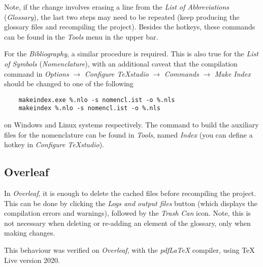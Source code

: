 \noindent Note, if the change involves erasing a line from the \textit{List of Abbreviations} (\textit{Glossary}), the last two steps may need to be repeated (keep producing the glossary files and recompiling the project). Besides the hotkeys, these commands can be found in the \textit{Tools} menu in the upper bar.

For the \textit{Bibliography}, a similar procedure is required. This is also true for the \textit{List of Symbols} (\textit{Nomenclature}), with an additional caveat that the compilation command in \textit{Options} $\rightarrow$ \textit{Configure TeXstudio} $\rightarrow$ \textit{Commands} $\rightarrow$ \textit{Make Index} should be changed to one of the following
\begin{verbatim}
	makeindex.exe %.nlo -s nomencl.ist -o %.nls
	makeindex %.nlo -s nomencl.ist -o %.nls
\end{verbatim}

\noindent on Windows and Linux systems respectively. The command to build the auxiliary files for the nomenclature can be found in \textit{Tools}, named \textit{Index} (you can define a hotkey in \textit{Configure TeXstudio}).

\subsection{Overleaf}

\noindent In \textit{Overleaf}, it is enough to delete the cached files before recompiling the project. This can be done by clicking the \textit{Logs and output files} button (which displays the compilation errors and warnings), followed by the \textit{Trash Can} icon. Note, this is not necessary when deleting or re-adding an element of the glossary, only when making changes.

This behaviour was verified on \textit{Overleaf}, with the \textit{pdfLaTeX} compiler, using TeX Live version 2020.


